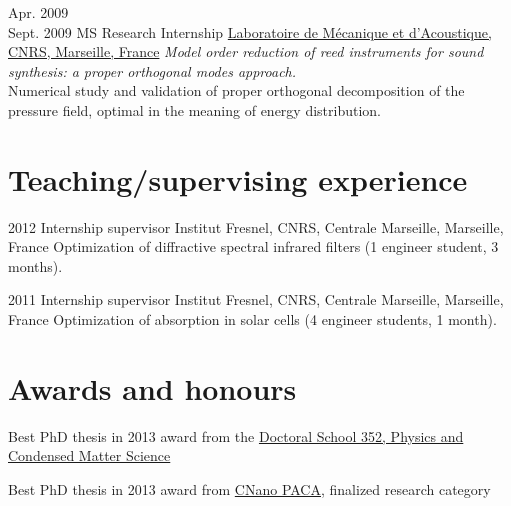 \documentclass[]{cv} %
\begin{document}
\begin{entrylist}

\entry
{Apr. 2009 \\Sept. 2009}
{MS Research Internship}
{\href{http://www.lma.cnrs-mrs.fr/}{Laboratoire de Mécanique et d'Acoustique, CNRS, Marseille, France}}
{\emph{Model order reduction of reed instruments for sound synthesis: a proper orthogonal modes approach.}\\
Numerical study and validation of proper orthogonal decomposition of the pressure field,
optimal in the meaning of energy distribution.
}


\end{entrylist}


\vspace*{-0.2cm}
\section{Teaching/supervising experience}

\begin{entrylist}
\entry
{2012}
{Internship supervisor}
{{Institut Fresnel}, CNRS, Centrale Marseille, Marseille, France}
{Optimization of diffractive spectral infrared filters (1 engineer student, 3 months).}

\entry
{2011}
{Internship supervisor}
{{Institut Fresnel}, CNRS, Centrale Marseille, Marseille, France}
{Optimization of absorption in solar cells (4 engineer students, 1 month).}


\end{entrylist}

\vspace*{-0.2cm}
\section{Awards and honours}

{Best PhD thesis in 2013 award} from the {\href{http://ed352.sciences.univmed.fr/}{Doctoral School 352, Physics and Condensed Matter Science}}

{Best PhD thesis in 2013 award from {\href{www.cnano-paca.fr/}{CNano PACA}}, finalized research category}
\end{document}
